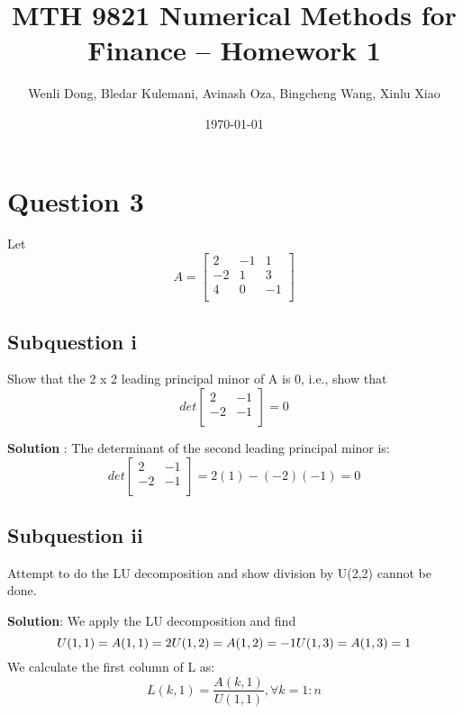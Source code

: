 \documentclass{article}
\title{MTH 9821 Numerical Methods for Finance -- Homework 1}
\author{Wenli Dong, Bledar Kulemani, Avinash Oza, Bingcheng Wang, Xinlu Xiao}
\date{\today}
\DeclareMathOperator{\1}{\mathit{1}}
\numberwithin{figure}{section} %
\begin{document}
\maketitle
\section{Question 3}
Let 
    \[
        A = 
        \begin{bmatrix}
            2 & -1 & 1 \\
            -2 & 1 & 3 \\
            4 & 0 & -1 \\
        \end{bmatrix}
    \]

\subsection{Subquestion i} 
Show that the 2 x 2 leading principal minor of A is 0, i.e., show that
    \[
        det \begin{bmatrix}
            2 & -1 \\
            -2 & -1 \\
        \end{bmatrix}  = 0
    \]

\textbf{Solution} : The determinant of the second leading principal minor is:
    \[
        det \begin{bmatrix}
            2 & -1 \\
            -2 & -1 \\
        \end{bmatrix}  = 2(1) - (-2)(-1) = 0
    \]

\subsection{Subquestion ii} 
Attempt to do the LU decomposition and show division by U(2,2) cannot be done.

\textbf{Solution}: We apply the LU decomposition and find 
    \[
        U(1,1) = A(1,1) = 2 \\
        U(1,2) = A(1,2) = -1 \\
        U(1,3) = A(1,3) = 1 \\
    \]
We calculate the first column of L as:
    \[
        L(k,1) = \frac{A(k,1)}{U(1,1)}, \forall k = 1:n 
    \]
\end{document}
